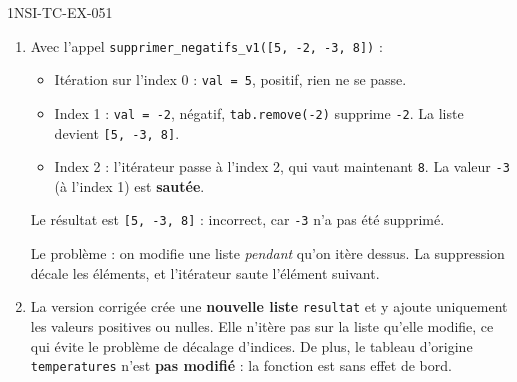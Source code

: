 \begin{corrige}{1NSI-TC-EX-051}
\begin{enumerate}
  \item Avec l'appel \lstinline{supprimer_negatifs_v1([5, -2, -3, 8])} :
  \begin{itemize}
    \item Itération sur l'index 0 : \lstinline{val = 5}, positif, rien ne se passe.
    \item Index 1 : \lstinline{val = -2}, négatif, \lstinline{tab.remove(-2)} supprime \lstinline{-2}. La liste devient \lstinline{[5, -3, 8]}.
    \item Index 2 : l'itérateur passe à l'index 2, qui vaut maintenant \lstinline{8}. La valeur \lstinline{-3} (à l'index 1) est \textbf{sautée}.
  \end{itemize}
  Le résultat est \lstinline{[5, -3, 8]} : incorrect, car \lstinline{-3} n'a pas été supprimé.

  Le problème : on modifie une liste \emph{pendant} qu'on itère dessus. La suppression décale les éléments, et l'itérateur saute l'élément suivant.

  \item La version corrigée crée une \textbf{nouvelle liste} \lstinline{resultat} et y ajoute uniquement les valeurs positives ou nulles. Elle n'itère pas sur la liste qu'elle modifie, ce qui évite le problème de décalage d'indices. De plus, le tableau d'origine \lstinline{temperatures} n'est \textbf{pas modifié} : la fonction est sans effet de bord.
\end{enumerate}
\end{corrige}
